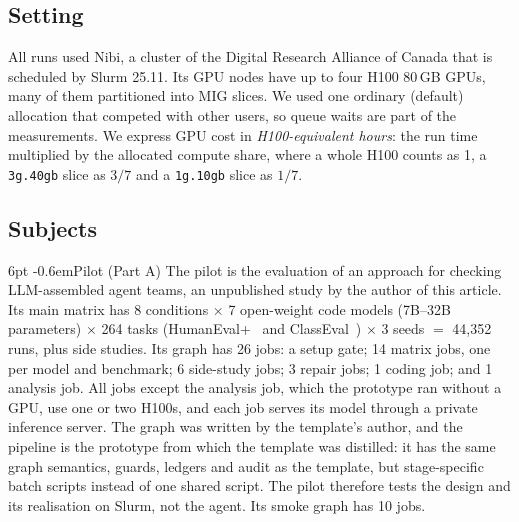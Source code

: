 \documentclass[pdflatex,sn-mathphys-num]{sn-jnl}
\makeatletter
\theoremstyle{thmstyletwo}%
\theoremstyle{thmstylethree}%
\newcommand{\code}[1]{\texttt{#1}}
\renewcommand\paragraph{\@startsection{paragraph}{4}{\z@}%
  {6pt \@plus 2pt \@minus 1pt}{-0.6em}{\normalfont\normalsize\bfseries}}
\makeatother
\begin{document}
\subsection{Setting}\label{sec:setting}

All runs used Nibi, a cluster of the Digital Research Alliance of Canada that is scheduled by Slurm 25.11. Its GPU nodes have up to four H100 80\,GB GPUs, many of them partitioned into MIG slices. We used one ordinary (default) allocation that competed with other users, so queue waits are part of the measurements. We express GPU cost in \emph{H100-equivalent hours}: the run time multiplied by the allocated compute share, where a whole H100 counts as 1, a \code{3g.40gb} slice as $3/7$ and a \code{1g.10gb} slice as $1/7$.

\subsection{Subjects}\label{sec:subjects}

\paragraph{Pilot (Part A)} The pilot is the evaluation of an approach for checking LLM-assembled agent teams, an unpublished study by the author of this article.
Its main matrix has 8 conditions $\times$ 7 open-weight code models (7B--32B parameters) $\times$ 264 tasks (HumanEval+~\cite{liu2023evalplus} and ClassEval~\cite{du2024classeval}) $\times$ 3 seeds $=$ 44{,}352 runs, plus side studies. Its graph has 26 jobs: a setup gate; 14 matrix jobs, one per model and benchmark; 6 side-study jobs; 3 repair jobs; 1 coding job; and 1 analysis job. All jobs except the analysis job, which the prototype ran without a GPU, use one or two H100s, and each job serves its model through a private inference server. The graph was written by the template's author, and the pipeline is the prototype from which the template was distilled: it has the same graph semantics, guards, ledgers and audit as the template, but stage-specific batch scripts instead of one shared script. The pilot therefore tests the design and its realisation on Slurm, not the agent. Its smoke graph has 10 jobs.
\end{document}
